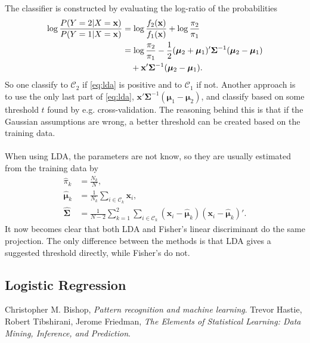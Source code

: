\documentclass[10pt,a4paper]{article}
\begin{document}
The classifier is constructed by evaluating the log-ratio of the probabilities
\begin{align}
  \label{eq:lda} 
  \log{\frac{P(Y=2|X=\mathbf{x})}{P(Y=1|X=\mathbf{x})}} &= \log{\frac{f_2(\mathbf{x})}{f_1(\mathbf{x})} } + \log{\frac{\pi_2}{\pi_1} } \notag \ \\
  &= \log{\frac{\pi_2}{\pi_1}} -\frac{1}{2} (\bm \mu_2+\bm \mu_1)' \bm{\Sigma}^{-1} (\bm \mu_2-\bm \mu_1) \\
  & \quad + \mathbf{x}'\bm{\Sigma}^{-1} (\bm \mu_2-\bm \mu_1).
  \notag \ 
\end{align}
So one classify to $\mathcal{C}_2$ if \eqref{eq:lda} is positive and to $\mathcal{C}_1$ if not. Another approach is to use the only last part of \eqref{eq:lda}, $\mathbf{x}'\bm{\Sigma}^{-1} (\bm \mu_1-\bm \mu_2)$, and classify based on some threshold $t$ found by e.g. cross-validation. The reasoning behind this is that if the Gaussian assumptions are wrong, a better threshold can be created based on the training data. \\
\\
When using LDA, the parameters are not know, so they are usually estimated from the training data by
\begin{align}
   \hat{\pi}_k &= \frac{N_k}{N},  \\
   \hat{\bm \mu}_k &= \frac{1}{N_k} \sum_{i \in \mathcal{C}_k}\mathbf{x}_i, \\
   \hat{\bm \Sigma} &= \frac{1}{N-2} \sum_{k = 1}^{2} \sum_{i \in \mathcal{C}_k}(\mathbf{x}_i - \hat{\bm{\mu}}_k)(\mathbf{x}_i - \hat{\bm{\mu}}_k)'.
\end{align}
It now becomes clear that both LDA and Fisher's linear discriminant do the same projection. The only difference between the methods is that LDA gives a suggested threshold directly, while Fisher's do not.



%
\subsection{Logistic Regression}
\label{sub:Logistic Regression}


%
\clearpage
\begin{thebibliography}{99} %
  Christopher M. Bishop,
  \emph{Pattern recognition and machine learning}.
  Trevor Hastie, Robert Tibshirani, Jerome Friedman,
  \emph{The Elements of Statistical Learning: Data Mining, Inference, and Prediction}.
\end{thebibliography}
%
\end{document}
